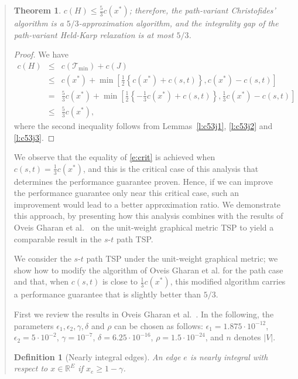 \documentclass[11pt,letterpaper]{article}
\newtheorem{thm}{Theorem}
\newtheorem{defn}{Definition}
\newcommand{\st}{\mbox{$s$-$t$} }
\begin{document}
\begin{quote}
\begin{thm}
$c(H)\leq\frac{5}{3}c(x^*)$; therefore, the path-variant Christofides' algorithm is a $5/3$-approximation algorithm, and the integrality gap of the path-variant Held-Karp relaxation is at most $5/3$.
\end{thm}
\begin{proof}
We have
\begin{eqnarray}
c(H) &\leq& c(\mathscr{T}_{\mathrm{min}})+c(J)\nonumber\\
&\leq& c(x^*)+\min\left [\frac{1}{2}\left\{c(x^*)+c(s,t)\right\} , c(x^*)-c(s,t) \right ]\nonumber\\
&=& \frac{5}{3}c(x^*)+\min\left [\frac{1}{2}\left\{-\frac{1}{3}c(x^*)+c(s,t)\right\} , \frac{1}{3}c(x^*)-c(s,t) \right ]\nonumber\\
&\leq& \frac{5}{3}c(x^*)\label{e:crit}
,\end{eqnarray}where the second inequality follows from Lemmas~\ref{l:c53j1}, \ref{l:c53j2} and \ref{l:c53j3}.
\end{proof}

We observe that the equality of \eqref{e:crit} is achieved when $c(s,t)=\frac{1}{3}c(x^*)$, and this is the critical case of this analysis that determines the performance guarantee proven. Hence, if we can improve the performance guarantee only near this critical case, such an improvement would lead to a better approximation ratio. We demonstrate this approach, by presenting how this analysis combines with the results of Oveis Gharan et al.~\cite{OSS} on the unit-weight graphical metric TSP to yield a comparable result in the \st path TSP.

We consider the \st path TSP under the unit-weight graphical metric; we show how to modify the algorithm of Oveis Gharan et al. for the path case and that, when $c(s,t)$ is close to $\frac{1}{3}c(x^*)$, this modified algorithm carries a performance guarantee that is slightly better than $5/3$.

First we review the results in Oveis Gharan et al.~\cite{OSS}. In the following, the parameters $\epsilon_1, \epsilon_2, \gamma, \delta$ and $\rho$ can be chosen as follows: $\epsilon_1 = 1.875\cdot 10^{-12}$, $\epsilon_2 = 5\cdot 10^{-2}$, $\gamma = 10^{-7}$, $\delta=6.25 \cdot 10^{-16}$, $\rho = 1.5\cdot 10^{-24}$, and $n$ denotes $|V|$.

\begin{defn}[Nearly integral edges]\label{d:niedges}
An edge $e$ is \emph{nearly integral} with respect to $x\in\mathbb{R}^E$ if $x_e\geq 1-\gamma$.
\end{defn}


\end{quote}
\end{document}
